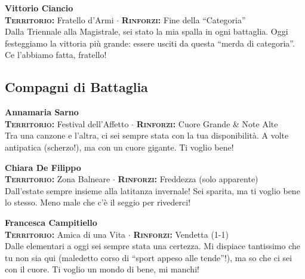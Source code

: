 \noindent\begin{minipage}{\linewidth}
\textbf{Vittorio Ciancio} \\
{\footnotesize \textbf{\textsc{Territorio:}} Fratello d'Armi $\cdot$ \textbf{\textsc{Rinforzi:}} Fine della ``Categoria''} \\
Dalla Triennale alla Magistrale, sei stato la mia spalla in ogni battaglia. Oggi festeggiamo la vittoria più grande: essere usciti da questa ``merda di categoria''. Ce l'abbiamo fatta, fratello!
\end{minipage}

\subsection*{Compagni di Battaglia}

\noindent\begin{minipage}{\linewidth}
\textbf{Annamaria Sarno} \\
{\footnotesize \textbf{\textsc{Territorio:}} Festival dell'Affetto $\cdot$ \textbf{\textsc{Rinforzi:}} Cuore Grande \& Note Alte} \\
Tra una canzone e l'altra, ci sei sempre stata con la tua disponibilità. A volte antipatica (scherzo!), ma con un cuore gigante. Ti voglio bene!
\end{minipage}
\vspace{0.6cm}

\noindent\begin{minipage}{\linewidth}
\textbf{Chiara De Filippo} \\
{\footnotesize \textbf{\textsc{Territorio:}} Zona Balneare $\cdot$ \textbf{\textsc{Rinforzi:}} Freddezza (solo apparente)} \\
Dall'estate sempre insieme alla latitanza invernale! Sei sparita, ma ti voglio bene lo stesso. Meno male che c'è il seggio per rivederci!
\end{minipage}
\vspace{0.6cm}

\noindent\begin{minipage}{\linewidth}
\textbf{Francesca Campitiello} \\
{\footnotesize \textbf{\textsc{Territorio:}} Amica di una Vita $\cdot$ \textbf{\textsc{Rinforzi:}} Vendetta (1-1)} \\
Dalle elementari a oggi sei sempre stata una certezza. Mi dispiace tantissimo che tu non sia qui (maledetto corso di ``sport appeso alle tende''!), ma so che ci sei con il cuore. Ti voglio un mondo di bene, mi manchi!
\end{minipage}
\vspace{0.6cm}

